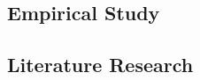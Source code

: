 \documentclass[a4paper,11pt]{article}
\begin{document}



\subsection{Empirical Study}


\subsection{Literature Research}
\end{document}
